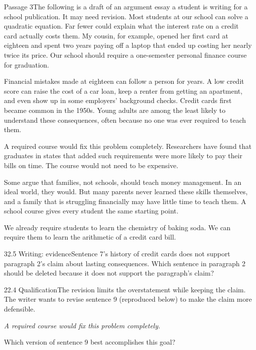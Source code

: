 \documentclass[11pt]{article}
\begin{document}
\begin{passage}{Passage 3}{The following is a draft of an argument essay a student is writing for a school publication. It may need revision.}
  Most students at our school can solve a quadratic equation.  Far fewer could explain what the interest rate on a credit card actually costs them.  My cousin, for example, opened her first card at eighteen and spent two years paying off a laptop that ended up costing her nearly twice its price.  Our school should require a one-semester personal finance course for graduation.

  Financial mistakes made at eighteen can follow a person for years.  A low credit score can raise the cost of a car loan, keep a renter from getting an apartment, and even show up in some employers' background checks.  Credit cards first became common in the 1950s.  Young adults are among the least likely to understand these consequences, often because no one was ever required to teach them.

  A required course would fix this problem completely.  Researchers have found that graduates in states that added such requirements were more likely to pay their bills on time.  The course would not need to be expensive.

  Some argue that families, not schools, should teach money management.  In an ideal world, they would.  But many parents never learned these skills themselves, and a family that is struggling financially may have little time to teach them.  A school course gives every student the same starting point.

  We already require students to learn the chemistry of baking soda.  We can require them to learn the arithmetic of a credit card bill.
\end{passage}

\begin{q}{3}{2.5 Writing: evidence}{Sentence 7's history of credit cards does not support paragraph 2's claim about lasting consequences.}
Which sentence in paragraph 2 should be deleted because it does not support the paragraph's claim?
\end{q}

\begin{q}{2}{2.4 Qualification}{The revision limits the overstatement while keeping the claim.}
The writer wants to revise sentence 9 (reproduced below) to make the claim more defensible.

\emph{A required course would fix this problem completely.}

Which version of sentence 9 best accomplishes this goal?
\end{q}
\end{document}
